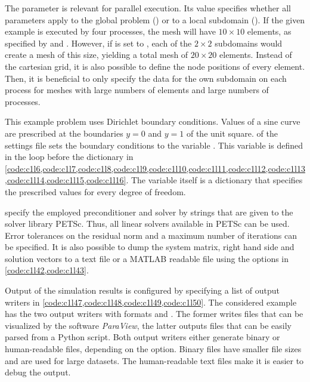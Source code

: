 The parameter  is relevant for parallel execution. Its value specifies whether all parameters apply to the global problem () or to a local subdomain (). If the given example is executed by four processes, the mesh will have $10\times 10$ elements, as specified by  and . 
However, if  is set to , each of the $2\times 2$ subdomains would create a mesh of this size, yielding a total mesh of $20 \times 20$ elements. Instead of the cartesian grid, it is also possible to define the node positions of every element. Then, it is beneficial to only specify the data for the own subdomain on each process for meshes with large numbers of elements and large numbers of processes.

This example problem uses Dirichlet boundary conditions. Values of a sine curve are prescribed at the boundaries $y=0$ and $y=1$ of the unit square.  of the settings file sets the boundary conditions to the variable . This variable is defined in the loop before the  dictionary in \cref{code:c1l6,code:c1l7,code:c1l8,code:c1l9,code:c1l10,code:c1l11,code:c1l12,code:c1l13,code:c1l14,code:c1l15,code:c1l16}. The  variable itself is a dictionary that specifies the prescribed values for every degree of freedom. 

 specify the employed preconditioner and solver by strings that are given to the solver library PETSc. Thus, all linear solvers available in PETSc can be used.
Error tolerances on the residual norm and a maximum number of iterations can be specified. It is also possible to dump the system matrix, right hand side and solution vectors to a text file or a MATLAB readable file using the options in \cref{code:c1l42,code:c1l43}.

Output of the simulation results is configured by specifying a list of output writers in \cref{code:c1l47,code:c1l48,code:c1l49,code:c1l50}. The considered example has the two output writers with formats  and . The former writes files that can be visualized by the software \emph{ParaView}, the latter outputs files that can be easily parsed from a Python script. Both output writers either generate binary or human-readable files, depending on the  option. Binary files have smaller file sizes and are used for large datasets. The human-readable text files make it is easier to debug the output.


